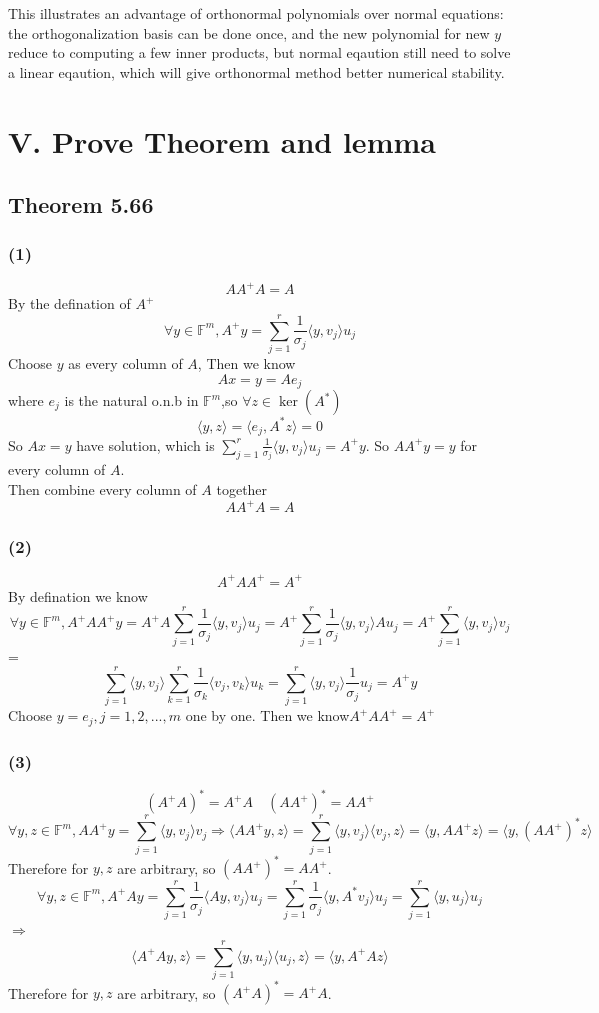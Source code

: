 \documentclass[a4paper]{article}
\begin{document}
This illustrates an advantage of orthonormal polynomials over normal equations:
the orthogonalization basis can be done once, and the new polynomial for new $y$
reduce to computing a few inner products, but normal eqaution still need to solve a linear
eqaution, which will give orthonormal method better numerical stability.



\section*{V. Prove Theorem and lemma}
\subsection*{Theorem 5.66}
\subsubsection*{(1)}
\[
AA^{+}A = A
\]
By the defination of $A^{+}$
\[
\forall y \in \mathbb{F}^m, A^{+}y = \sum_{j = 1}^{r}\frac{1}{\sigma_j}\langle y,v_j\rangle u_j
\]
Choose $y$ as every column of $A$, Then we know
\[
A x = y = Ae_j
\]
where $e_j$ is the natural o.n.b in $\mathbb{F}^m$,so $\forall z \in \ker(A^*)$
\[
\langle y,z\rangle = \langle e_j,A^*z\rangle = 0
\]
So \(A x = y\) have solution, which is $\sum_{j = 1}^{r}\frac{1}{\sigma_j}\langle y,v_j\rangle u_j = A^{+}y$. 
So \(AA^{+}y = y\) for every column of $A$.
\\
Then combine every column of $A$ together 
\[
AA^{+}A = A
\]
\subsubsection*{(2)}
\[
A^{+}AA^{+} = A^{+}
\]
By defination we know 
\[
\forall y \in \mathbb{F}^m,A^{+}AA^{+}y = A^{+}A\sum_{j = 1}^{r}\frac{1}{\sigma_j}\langle y,v_j\rangle u_j = 
A^{+}\sum_{j = 1}^{r}\frac{1}{\sigma_j}\langle y,v_j\rangle Au_j = A^{+}\sum_{j = 1}^{r}\langle y,v_j\rangle v_j 
\]
=
\[
\sum_{j = 1}^{r}\langle y,v_j\rangle \sum_{k = 1}^{r}\frac{1}{\sigma_k}\langle v_j,v_k\rangle u_k =
\sum_{j = 1}^{r}\langle y,v_j\rangle \frac{1}{\sigma_j} u_j = A^{+}y
\]
Choose $y = e_j ,j = 1,2,...,m$ one by one. Then we know\(A^{+}AA^{+} = A^{+}\)
\subsubsection*{(3)}
\[
(A^+A)^* = A^+ A \quad (AA^+)^* = AA^+
\]
\[
\forall y,z \in \mathbb{F}^m,  AA^+y = \sum_{j = 1}^{r}\langle y,v_j\rangle v_j \Rightarrow
\langle  AA^+y,z\rangle =  
\sum_{j = 1}^{r}\langle y,v_j\rangle \langle  v_j,z\rangle = 
\langle  y,AA^+z\rangle = \langle  y,(AA^+)^*z\rangle 
\]
Therefore for $y,z$ are arbitrary, so $(AA^+)^* = AA^+$.
\[
\forall y,z \in \mathbb{F}^m,  A^+Ay = \sum_{j = 1}^{r}\frac{1}{\sigma_j}\langle Ay,v_j\rangle u_j
= \sum_{j = 1}^{r}\frac{1}{\sigma_j}\langle y,A^*v_j\rangle u_j
= \sum_{j = 1}^{r}\langle y,u_j\rangle u_j
\]
$\Rightarrow$
\[
\langle  A^+Ay,z\rangle = \sum_{j = 1}^{r}\langle y,u_j\rangle \langle u_j,z\rangle
= \langle y,A^+Az\rangle
\]
Therefore for $y,z$ are arbitrary, so $(A^+A)^* = A^+ A$.
\end{document}
